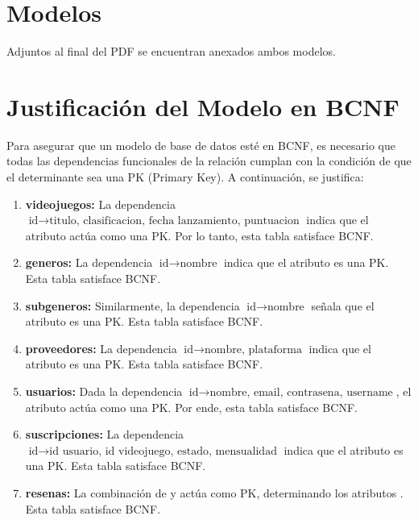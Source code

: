 \documentclass[12pt]{article}
\begin{document}
\section{Modelos}

Adjuntos al final del PDF se encuentran anexados ambos modelos.

\section{Justificación del Modelo en BCNF}

Para asegurar que un modelo de base de datos esté en BCNF, es necesario que todas las dependencias funcionales de la relación cumplan con la condición de que el determinante sea una PK (Primary Key). A continuación, se justifica:

\begin{enumerate}
    \item \textbf{videojuegos:} La dependencia \( \text{id} \rightarrow \text{titulo, clasificacion, fecha lanzamiento, puntuacion} \) indica que el atributo  actúa como una PK. Por lo tanto, esta tabla satisface BCNF.
    
    \item \textbf{generos:} La dependencia \( \text{id} \rightarrow \text{nombre} \) indica que el atributo  es una PK. Esta tabla satisface BCNF.
    
    \item \textbf{subgeneros:} Similarmente, la dependencia \( \text{id} \rightarrow \text{nombre} \) señala que el atributo  es una PK. Esta tabla satisface BCNF.
    
    \item \textbf{proveedores:} La dependencia \( \text{id} \rightarrow \text{nombre, plataforma} \) indica que el atributo  es una PK. Esta tabla satisface BCNF.
    
    \item \textbf{usuarios:} Dada la dependencia \( \text{id} \rightarrow \text{nombre, email, contrasena, username} \), el atributo  actúa como una PK. Por ende, esta tabla satisface BCNF.
    
    \item \textbf{suscripciones:} La dependencia \( \text{id} \rightarrow \text{id usuario, id videojuego, estado, mensualidad} \) indica que el atributo  es una PK. Esta tabla satisface BCNF.
    
    \item \textbf{resenas:} La combinación de  y  actúa como PK, determinando los atributos . Esta tabla satisface BCNF.


\end{enumerate}
\end{document}
